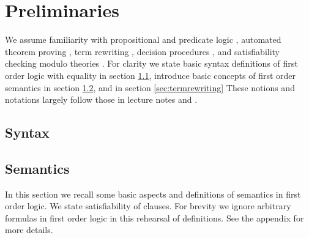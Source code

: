 
\chapter{Preliminaries}



We assume familiarity with propositional and predicate logic \cite{Huth:2004:LCS:975331}, 
automated theorem proving \cite{Fitting:1996:FLA:230183}, 
term rewriting \cite{Baader:1998:TR:280474}, 
decision procedures \cite{Kroening:2008:DPA:1391237}, 
and satisfiability checking modulo theories \cite{Biere:2009:HSV:1550723}.
For clarity we state basic syntax definitions of first order logic with equality in section \ref{sec:syntax},
introduce basic concepts of first order semantics in section \ref{sec:semantics},
and in section \ref{sec:termrewriting} 
These notions and notations largely follow those in lecture notes \cite{AM2015tr} and \cite{GM2013ar}.


\section{Syntax}\label{sec:syntax}

















\section{Semantics}\label{sec:semantics}

In this section we recall some basic aspects and definitions of semantics in first order logic. 
We state satisfiability of clauses. For brevity we ignore arbitrary formulas in first order logic
in this rehearsal of definitions. See the appendix for more details.

